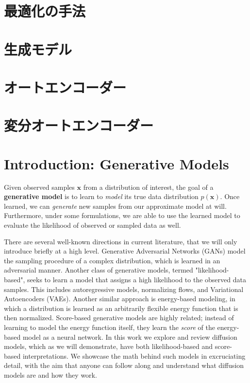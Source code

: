 
\section{最適化の手法}



\section{生成モデル}


\section{オートエンコーダー}

\section{変分オートエンコーダー}
\section*{Introduction: Generative Models}
%

Given observed samples $\bm{x}$ from a distribution of interest, the goal of a \textbf{generative model} is to learn to \textit{model} its true data distribution $p(\bm{x})$.  Once learned, we can \textit{generate} new samples from our approximate model at will.  Furthermore, under some formulations, we are able to use the learned model to evaluate the likelihood of observed or sampled data as well.

There are several well-known directions in current literature, that we will only introduce briefly at a high level.  Generative Adversarial Networks (GANs) model the sampling procedure of a complex distribution, which is learned in an adversarial manner.  Another class of generative models, termed "likelihood-based", seeks to learn a model that assigns a high likelihood to the observed data samples.  This includes autoregressive models, normalizing flows, and Variational Autoencoders (VAEs).  Another similar approach is energy-based modeling, in which a distribution is learned as an arbitrarily flexible energy function that is then normalized.  Score-based generative models are highly related; instead of learning to model the energy function itself, they learn the \textit{score} of the energy-based model as a neural network.  In this work we explore and review diffusion models, which as we will demonstrate, have both likelihood-based and score-based interpretations.  We showcase the math behind such models in excruciating detail, with the aim that anyone can follow along and understand what diffusion models are and how they work.


